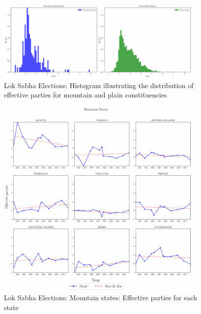 \begin{figure}[htbp]
    \centering
    \includegraphics[width=0.9\textwidth]{figures/lok/histogram.pdf}
    \caption{Lok Sabha Elections: Histogram illustrating the distribution of effective parties for mountain and plain constituencies}
    \label{img:histogram}
\end{figure}

\begin{figure}[htbp]
    \centering
    \includegraphics[width=0.9\textwidth]{figures/lok/mountain_states.pdf}
    \caption{Lok Sabha Elections: Mountain states: Effective parties for each state}
    \label{img:mountain_enp}
\end{figure}

